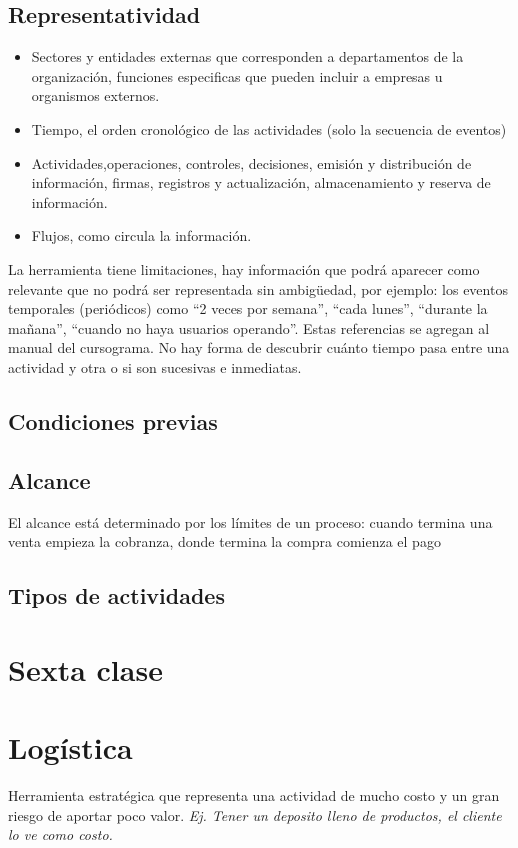 \documentclass[titlepage,a4paper]{article}
\begin{document}
\subsection*{Representatividad}
\begin{itemize}
\item Sectores y entidades externas que corresponden a departamentos de la organización, funciones especificas que pueden incluir a empresas u organismos externos.
\item Tiempo, el orden cronológico de las actividades (solo la secuencia de eventos)
\item Actividades,operaciones, controles, decisiones, emisión y distribución de información, firmas, registros y actualización, almacenamiento y reserva de información.
\item Flujos, como circula la información.
\end{itemize}

La herramienta tiene limitaciones, hay información que podrá aparecer como relevante que no
podrá ser representada sin ambigüedad, por ejemplo: los eventos temporales (periódicos) como “2
veces por semana”, “cada lunes”, “durante la mañana”, “cuando no haya usuarios operando”. Estas
referencias se agregan al manual del cursograma. No hay forma de descubrir cuánto tiempo pasa entre una actividad
y otra o si son sucesivas e inmediatas.


\subsection*{Condiciones previas}


\subsection*{Alcance}
El alcance está determinado por los límites de un proceso: cuando termina una venta empieza la
cobranza, donde termina la compra comienza el pago

\subsection*{Tipos de actividades}


\section*{Sexta clase}

\section{Logística}
Herramienta estratégica que representa una actividad de mucho costo y un gran riesgo de aportar poco valor. \textit{Ej. Tener un deposito lleno de productos, el cliente lo ve como costo.}
\end{document}
